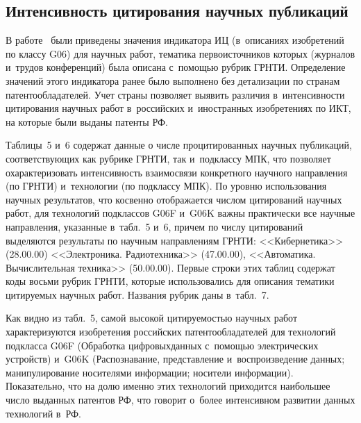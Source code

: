 \begin{multicols}{2}
\section{Интенсивность цитирования научных публикаций}
 
     В работе~\cite{19-min} были приведены значения индикатора ИЦ 
(в~описаниях изобретений по классу G06) для научных работ, тематика 
первоисточников которых (журналов и~трудов конференций) была описана 
с~помощью рубрик ГРНТИ. Определение значений этого индикатора ранее было 
выполнено без детализации по странам патентообладателей. Учет страны 
позволяет выявить различия в~интенсивности цитирования научных работ 
в~российских и~иностранных изобретениях по ИКТ, на которые были выданы 
патенты РФ. 

Таблицы~5 и~6 содержат данные о числе процитированных научных 
публикаций, соответствующих как рубрике ГРНТИ, так и~подклассу МПК, что 
позволяет охарактеризовать интенсивность взаимосвязи конкретного научного 
направления (по ГРНТИ) и~технологии (по подклассу МПК). По уровню 
использования научных результатов, что косвенно отображается чис\-лом 
цитирований научных работ, для технологий подклассов G06F и~G06K важны 
практически все научные направления, указанные в~табл.~5 и~6, причем по чис\-лу 
цитирований выделяются результаты по научным направлениям ГРНТИ: 
<<Кибернетика>> (28.00.00) <<Электроника. Радиотехника>> (47.00.00), 
<<Автоматика. Вычислительная техника>> (50.00.00). Первые строки этих таб\-лиц 
содержат коды восьми рубрик ГРНТИ, которые использовались для описания 
тематики цитируемых научных работ. Названия рубрик даны в~табл.~7.
     

     
     Как видно из табл.~5, самой высокой цитируемостью научных работ 
характеризуются изобретения российских патентообладателей для технологий 
подкласса G06F (Обработка цифровых\linebreak данных с~помощью электрических 
устройств) и~G06K (Распознавание, представление и~воспроизведение данных; 
манипулирование носителями информации; носители информации). 
Показательно, что на долю именно этих технологий приходится наибольшее 
число выданных патентов РФ, что говорит о~более интенсивном развитии данных 
технологий в~РФ.
     


\begin{table*}\small %
     \begin{center}
     \vspace*{2ex}
     

\end{center}
\end{table*}
\end{multicols}
